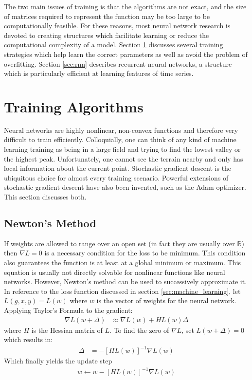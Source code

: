 The two main issues of training is that the algorithms are not exact, and the size of matrices required to represent the function may be too large to be computationally feasible. For these reasons, most neural network research is devoted to creating structures which facilitate learning or reduce the computational complexity of a model.  Section \ref{sec:training} discusses several training strategies which help learn the correct parameters as well as avoid the problem of overfitting.  Section \ref{sec:rnn} describes recurrent neural networks, a structure which is particularly efficient at learning features of time series.  

\section{Training Algorithms}\label{sec:training}
Neural networks are highly nonlinear, non-convex functions and therefore very difficult to train efficiently.  Colloquially, one can think of any kind of machine learning training as being in a large field and trying to find the lowest valley or the highest peak.  Unfortunately, one cannot see the terrain nearby and only has local information about the current point.  Stochastic gradient descent is the ubiquitous choice for almost every training scenario.  Powerful extensions of stochastic gradient descent have also been invented, such as the Adam optimizer.  This section discusses both.

\subsection{Newton's Method}
If weights are allowed to range over an open set (in fact they are usually over $\mathbb{R}$) then $\nabla L = 0$ is a necessary condition for the loss to be minimum.  This condition also guarantees the function is at least at a global minimum or maximum.  This equation is usually not directly solvable for nonlinear functions like neural networks.  However, Newton's method can be used to successively approximate it.  In reference to the loss function discussed in section \ref{sec:machine_learning}, let $L(g,x,y) = L(w)$ where $w$ is the vector of weights for the neural network.  Applying Taylor's Formula to the gradient:
\begin{align}
\nabla L(w+\Delta) &\approx \nabla L(w) + HL(w)\Delta
\end{align}
where $H$ is the Hessian matrix of $L$. 
To find the zero of $\nabla L$, set $L(w+\Delta) = 0$ which results in:
\begin{align}\label{eq:newton}
\Delta &= -[HL(w)]^{-1}\nabla L(w)
\end{align}
Which finally yields the update step
\begin{align}\label{eq:newtons}
w \gets w - [HL(w)]^{-1}\nabla L(w)
\end{align}

